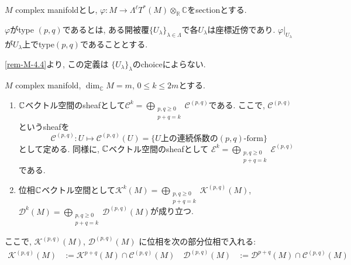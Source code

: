 \begin{tcolorbox}[mybox]
\begin{defn}
\label{defn-M-4.5}
\(M\) complex manifoldとし, 
\(
\varphi : M \to \Lambda^{\ell}T^{*}(M)\otimes_{\mathbb{R}}\mathbb{C}
\)をsectionとする. 

\(\varphi\)がtype $(p,q)$であるとは, 
ある開被覆$\{U_{\lambda}\}_{\lambda\in\Lambda}$で各$U_{\lambda}$は座標近傍であり. 
\(\varphi|_{U_{\lambda}}\)が$U_\lambda$上でtype$(p,q)$であることとする.  
\end{defn}
\end{tcolorbox}


\begin{rem}
\ref{rem-M-4.4}より, この定義は \(\{U_{\lambda}\}_{\lambda}\)のchoiceによらない. 
\end{rem}

\begin{tcolorbox}[mybox]
\begin{lem}
\label{lem-M-4.7}
\(M\) complex manifold, \(\dim_{\mathbb{C}} M= m\), \(0\leq k\leq 2m\)とする. 
\begin{enumerate}
\item $\mathbb{C}$ベクトル空間のsheafとして\(\mathcal{C}^{k}=\bigoplus_{\substack{p,q\geq 0\\ p+q=k}}\mathcal{C}^{(p,q)}\)である.
ここで,  \(\mathcal{C}^{(p,q)}\) というsheafを
\[
\mathcal{C}^{(p,q)} : U \longmapsto
 \mathcal{C}^{(p,q)}(U)=\{\text{$U$上の連続係数の$(p,q)$-form}\}
\]
として定める. 
同様に, $\mathbb{C}$ベクトル空間のsheafとして
\(\mathcal{E}^{k}=\bigoplus_{\substack{p,q\geq 0\\ p+q=k}}\mathcal{E}^{(p,q)} \)である. 
\item  位相$\mathbb{C}$ベクトル空間として\(\mathcal{K}^{k}(M)=\bigoplus_{\substack{p,q\geq 0\\ p+q=k}}\mathcal{K}^{(p,q)}(M)\), 
\(
\mathcal{D}^{k}(M)=\bigoplus_{\substack{p,q\geq 0\\ p+q=k}}\mathcal{D}^{(p,q)}(M)
\)が成り立つ. 

\end{enumerate}
\end{lem}
\end{tcolorbox}

ここで,  \(\mathcal{K}^{(p,q)}(M)\), \(\mathcal{D}^{(p,q)}(M)\) に位相を次の部分位相で入れる:
\[
\begin{aligned}
\mathcal{K}^{(p,q)}(M) &:= \mathcal{K}^{p+q}(M)\cap \mathcal{C}^{(p,q)}(M)
\quad 
\mathcal{D}^{(p,q)}(M) &:= \mathcal{D}^{p+q}(M)\cap \mathcal{C}^{(p,q)}(M)
\end{aligned}
\]

